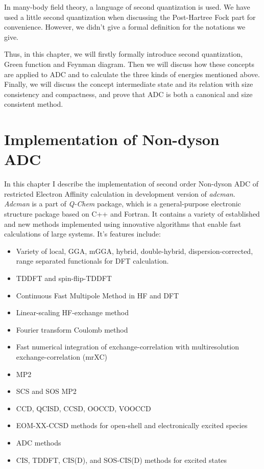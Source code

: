 \documentclass[bachelor, english]{ustcthesis}
\begin{document}
In many-body field theory, a language of second quantization is used.
We have used a little second quantization when discussing the Post-Hartree Fock part for convenience.
However, we didn't give a formal definition for the notations we give.

Thus, in this chapter, we will firstly formally introduce second quantization, Green function and Feynman diagram.
Then we will discuss how these concepts are applied to ADC and to calculate the three kinds of energies mentioned above.
Finally, we will discuss the concept intermediate state and its relation with size consistency and compactness, and prove that ADC is both a canonical and size consistent method.






\chapter{Implementation of Non-dyson ADC}
In this chapter I describe the implementation of second order Non-dyson ADC of restricted Electron Affinity calculation in development version of \emph{adcman}.
\emph{Adcman} is a part of \emph{Q-Chem} package, which is a general-purpose electronic structure package based on C++ and Fortran.
It contains a variety of established and new methods implemented using innovative algorithms that enable fast calculations of large systems.
It's features include:
\begin{itemize}
	\item Variety of local, GGA, mGGA, hybrid, double-hybrid, dispersion-corrected, range separated functionals for DFT calculation.
	\item TDDFT and spin-flip-TDDFT
	\item Continuous Fast Multipole Method in HF and DFT
	\item Linear-scaling HF-exchange method
	\item Fourier transform Coulomb method
	\item Fast numerical integration of exchange-correlation with multiresolution exchange-correlation (mrXC)
	\item MP2
	\item SCS and SOS MP2
	\item CCD, QCISD, CCSD, OOCCD, VOOCCD
	\item EOM-XX-CCSD methods for open-shell and electronically excited species
	\item ADC methods
	\item CIS, TDDFT, CIS(D), and SOS-CIS(D) methods for excited states
\end{itemize}
\end{document}

